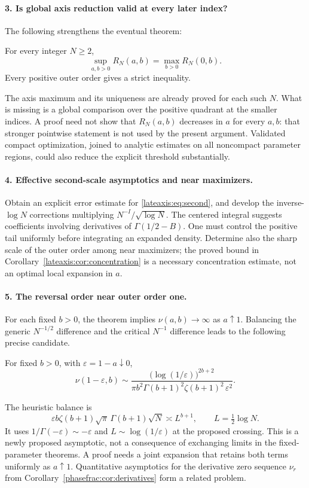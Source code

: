 \paragraph{3. Is global axis reduction valid at every later index?}
The following strengthens the eventual theorem:
\begin{conjecture}
\label{research:conj:allaxis}
For every integer $N\ge2$,
\[
 \sup_{a,b>0}R_N(a,b)=\max_{b>0}R_N(0,b).
\]
Every positive outer order gives a strict inequality.
\end{conjecture}
The axis maximum and its uniqueness are already proved for each such
$N$. What is missing is a global comparison over the positive
quadrant at the smaller indices. A proof need not show that
$R_N(a,b)$ decreases in $a$ for every $a,b$: that stronger
pointwise statement is not used by the present argument.
Validated compact optimization, joined to analytic estimates on all
noncompact parameter regions, could also reduce the explicit
threshold substantially.

\paragraph{4. Effective second-scale asymptotics and near maximizers.}
Obtain an explicit error estimate for
\eqref{lateaxis:eq:second}, and develop the inverse-$\log N$
corrections multiplying $N^{-I}/\sqrt{\log N}$. The centered
integral suggests coefficients involving derivatives of
$\Gamma(1/2-B)$. One must control the positive tail uniformly
before integrating an expanded density. Determine also the
sharp scale of the outer order among near maximizers; the proved
bound in Corollary~\ref{lateaxis:cor:concentration} is a necessary
concentration estimate, not an optimal local expansion in $a$.

\paragraph{5. The reversal order near outer order one.}
For each fixed $b>0$, the theorem implies
$\nu(a,b)\to\infty$ as $a\uparrow1$. Balancing the generic
$N^{-1/2}$ difference and the critical $N^{-1}$ difference leads
to the following precise candidate.
\begin{conjecture}
\label{research:conj:crossing}
For fixed $b>0$, with $\varepsilon=1-a\downarrow0$,
\[
 \nu(1-\varepsilon,b)\sim
 \frac{\bigl(\log(1/\varepsilon)\bigr)^{2b+2}}
 {\pi b^2\Gamma(b+1)^2\zeta(b+1)^2\,\varepsilon^2}.
\]
\end{conjecture}
The heuristic balance is
\[
 \varepsilon b\zeta(b+1)\sqrt\pi\,\Gamma(b+1)\sqrt N
 \asymp L^{b+1},\qquad L=\tfrac12\log N.
\]
It uses $1/\Gamma(-\varepsilon)\sim-\varepsilon$ and
$L\sim\log(1/\varepsilon)$ at the proposed crossing.
This is a newly proposed asymptotic, not a consequence of exchanging
limits in the fixed-parameter theorems. A proof needs a joint
expansion that retains both terms uniformly as $a\uparrow1$.
Quantitative asymptotics for the derivative zero sequence
$\nu_r$ from Corollary~\ref{phasefrac:cor:derivatives} form a
related problem.

